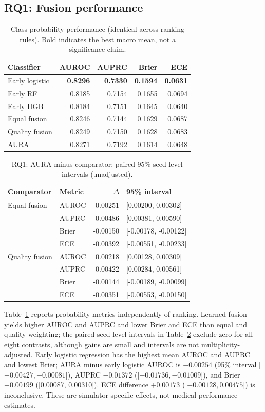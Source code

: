 \documentclass[conference]{IEEEtran}
\begin{document}
\subsection{RQ1: Fusion performance}
\begin{table}[t]
\caption{Class probability performance (identical across ranking rules). Bold indicates the best macro mean, not a significance claim.}
\label{tab:macro}
\centering\footnotesize
\begin{tabular}{@{}lrrrr@{}}\toprule
Classifier & AUROC & AUPRC & Brier & ECE\\\midrule
Early logistic & \textbf{0.8296} & \textbf{0.7330} & \textbf{0.1594} & \textbf{0.0631}\\
Early RF & 0.8185 & 0.7154 & 0.1655 & 0.0694\\
Early HGB & 0.8184 & 0.7151 & 0.1645 & 0.0640\\
Equal fusion & 0.8246 & 0.7144 & 0.1629 & 0.0687\\
Quality fusion & 0.8249 & 0.7150 & 0.1628 & 0.0683\\
AURA & 0.8271 & 0.7192 & 0.1614 & 0.0648\\\bottomrule
\end{tabular}
\end{table}
\begin{table}[t]
\caption{RQ1: AURA minus comparator; paired 95\% seed-level intervals (unadjusted).}
\label{tab:fusionci}
\centering\footnotesize
\begin{tabular}{@{}llrl@{}}\toprule
Comparator & Metric & $\Delta$ & 95\% interval\\\midrule
Equal fusion & AUROC & 0.00251 & [0.00200, 0.00302]\\
 & AUPRC & 0.00486 & [0.00381, 0.00590]\\
 & Brier & -0.00150 & [-0.00178, -0.00122]\\
 & ECE & -0.00392 & [-0.00551, -0.00233]\\
Quality fusion & AUROC & 0.00218 & [0.00128, 0.00309]\\
 & AUPRC & 0.00422 & [0.00284, 0.00561]\\
 & Brier & -0.00144 & [-0.00189, -0.00099]\\
 & ECE & -0.00351 & [-0.00553, -0.00150]\\\bottomrule
\end{tabular}
\end{table}
Table~\ref{tab:macro} reports probability metrics independently of ranking. Learned fusion yields higher AUROC and AUPRC and lower Brier and ECE than equal and quality weighting; the paired seed-level intervals in Table~\ref{tab:fusionci} exclude zero for all eight contrasts, although gains are small and intervals are not multiplicity-adjusted. Early logistic regression has the highest mean AUROC and AUPRC and lowest Brier; AURA minus early logistic AUROC is $-0.00254$ (95\% interval [$-0.00427,-0.00081$]), AUPRC $-0.01372$ ([$-0.01736,-0.01009$]), and Brier $+0.00199$ ([0.00087, 0.00310]). ECE difference $+0.00173$ ([$-0.00128,0.00475$]) is inconclusive. These are simulator-specific effects, not medical performance estimates.
\end{document}
